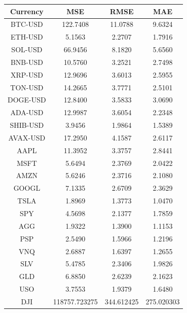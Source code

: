 \begin{table}[h]
\centering
\begin{tabular}{|c|c|c|c|}
\hline
\textbf{Currency} & \textbf{MSE} & \textbf{RMSE} & \textbf{MAE} \\ \hline
BTC-USD            & 122.7408     & 11.0788       & 9.6324       \\ \hline
ETH-USD            & 5.1563       & 2.2707        & 1.7916       \\ \hline
SOL-USD            & 66.9456      & 8.1820        & 5.6560       \\ \hline
BNB-USD            & 10.5760      & 3.2521        & 2.7498       \\ \hline
XRP-USD            & 12.9696      & 3.6013        & 2.5955       \\ \hline
TON-USD            & 14.2665      & 3.7771        & 2.5101       \\ \hline
DOGE-USD           & 12.8400      & 3.5833        & 3.0690       \\ \hline
ADA-USD            & 12.9987      & 3.6054        & 2.2348       \\ \hline
SHIB-USD           & 3.9456       & 1.9864        & 1.5389       \\ \hline
AVAX-USD           & 17.2950      & 4.1587        & 2.6117       \\ \hline
AAPL               & 11.3952      & 3.3757        & 2.8441       \\ \hline
MSFT               & 5.6494       & 2.3769        & 2.0422       \\ \hline
AMZN               & 5.6246       & 2.3716        & 2.1080       \\ \hline
GOOGL              & 7.1335       & 2.6709        & 2.3629       \\ \hline
TSLA               & 1.8969       & 1.3773        & 1.0470       \\ \hline
SPY                & 4.5698       & 2.1377        & 1.7859       \\ \hline
AGG                & 1.9322       & 1.3900        & 1.1153       \\ \hline
PSP                & 2.5490       & 1.5966        & 1.2196       \\ \hline
VNQ                & 2.6887       & 1.6397        & 1.2655       \\ \hline
SLV                & 5.4785       & 2.3406        & 1.9826       \\ \hline
GLD                & 6.8850       & 2.6239        & 2.1623       \\ \hline
USO                & 3.7553       & 1.9379        & 1.6480       \\ \hline
DJI                & 118757.723275       & 344.612425        & 275.020303       \\ \hline
\hline
\end{tabular}
\end{table}


